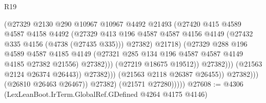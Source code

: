 \begin{lexlean}{R19}
\begin{coremodule}
                                          (@27329
                                            @2130
                                            @290
                                            @10967
                                            @10967
                                            @4492
                                            @21493
                                            (@27420
                                              @415
                                              @4589
                                              @4587
                                              @4158
                                              @4492
                                              (@27329
                                                @413
                                                @196
                                                @4587
                                                @4587
                                                @4156
                                                @4149
                                                (@27432 @335 @4156 (@4738 (@27435 @335)))
                                                @27382)
                                              @21718)
                                            (@27329
                                              @288
                                              @196
                                              @4589
                                              @4587
                                              @4185
                                              @4149
                                              (@27321
                                                @285
                                                @134
                                                @196
                                                @4587
                                                @4587
                                                @4149
                                                @4185
                                                @27382
                                                @21556)
                                              @27382)))
                                        (@27219 @18675 @19512))
                                      @27382)))
                                (@21563 @2124 @26374 @26443))
                              @27382)))
                        (@21563 @2118 @26387 @26455))
                      @27382)))
                (@26810 @26463 @26467))
              @27382)
            (@21571 @27280)))))
@27608 := @4306 (LexLeanBoot.IrTerm.GlobalRef.GDefined @4264 @4175 @4146)

\end{coremodule}
\end{lexlean}
